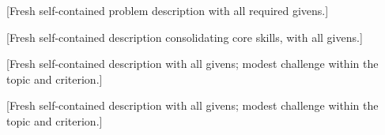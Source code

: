 [Fresh self-contained problem description with all required givens.]

[Fresh self-contained description consolidating core skills, with all givens.]

[Fresh self-contained description with all givens; modest challenge within the topic and criterion.]

[Fresh self-contained description with all givens; modest challenge within the topic and criterion.]

\par\clearpage %
\endgroup

